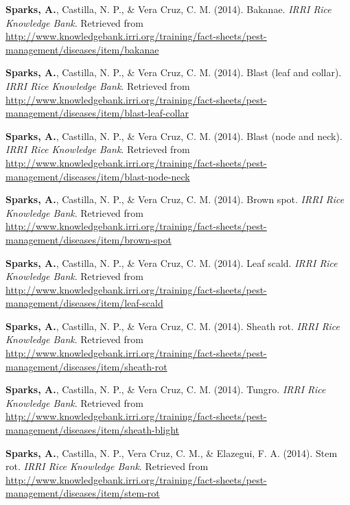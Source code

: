 \documentclass[11pt, a4paper]{awesome-cv}
\begin{document}
\leavevmode{}%
\textbf{Sparks, A.}, Castilla, N. P., \& Vera Cruz, C. M. (2014).
Bakanae. \emph{{IRRI} Rice Knowledge Bank}. Retrieved from
\url{http://www.knowledgebank.irri.org/training/fact-sheets/pest-management/diseases/item/bakanae}

\leavevmode{}%
\textbf{Sparks, A.}, Castilla, N. P., \& Vera Cruz, C. M. (2014). Blast
(leaf and collar). \emph{{IRRI} Rice Knowledge Bank}. Retrieved from
\url{http://www.knowledgebank.irri.org/training/fact-sheets/pest-management/diseases/item/blast-leaf-collar}

\leavevmode{}%
\textbf{Sparks, A.}, Castilla, N. P., \& Vera Cruz, C. M. (2014). Blast
(node and neck). \emph{{IRRI} Rice Knowledge Bank}. Retrieved from
\url{http://www.knowledgebank.irri.org/training/fact-sheets/pest-management/diseases/item/blast-node-neck}

\leavevmode{}%
\textbf{Sparks, A.}, Castilla, N. P., \& Vera Cruz, C. M. (2014). Brown
spot. \emph{{IRRI} Rice Knowledge Bank}. Retrieved from
\url{http://www.knowledgebank.irri.org/training/fact-sheets/pest-management/diseases/item/brown-spot}

\leavevmode{}%
\textbf{Sparks, A.}, Castilla, N. P., \& Vera Cruz, C. M. (2014). Leaf
scald. \emph{{IRRI} Rice Knowledge Bank}. Retrieved from
\url{http://www.knowledgebank.irri.org/training/fact-sheets/pest-management/diseases/item/leaf-scald}

\leavevmode{}%
\textbf{Sparks, A.}, Castilla, N. P., \& Vera Cruz, C. M. (2014). Sheath
rot. \emph{{IRRI} Rice Knowledge Bank}. Retrieved from
\url{http://www.knowledgebank.irri.org/training/fact-sheets/pest-management/diseases/item/sheath-rot}

\leavevmode{}%
\textbf{Sparks, A.}, Castilla, N. P., \& Vera Cruz, C. M. (2014).
Tungro. \emph{{IRRI} Rice Knowledge Bank}. Retrieved from
\url{http://www.knowledgebank.irri.org/training/fact-sheets/pest-management/diseases/item/sheath-blight}

\leavevmode{}%
\textbf{Sparks, A.}, Castilla, N. P., Vera Cruz, C. M., \& Elazegui, F.
A. (2014). Stem rot. \emph{{IRRI} Rice Knowledge Bank}. Retrieved from
\url{http://www.knowledgebank.irri.org/training/fact-sheets/pest-management/diseases/item/stem-rot}
\end{document}
